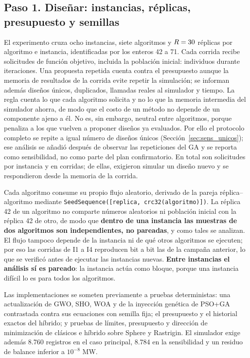 \subsection{Paso 1. Diseñar: instancias, réplicas, presupuesto y semillas}

El experimento cruza ocho instancias, siete algoritmos y $R=30$ réplicas por algoritmo e instancia, identificadas por los enteros 42 a 71. Cada corrida recibe \RequestsPerRun{} solicitudes de función objetivo, incluida la población inicial: \Population{} individuos durante \Iterations{} iteraciones. Una propuesta repetida cuenta contra el presupuesto aunque la memoria de resultados de la corrida evite repetir la simulación; se informan además diseños únicos, duplicados, llamadas reales al simulador y tiempo. La regla cuenta lo que cada algoritmo solicita y no lo que la memoria intermedia del simulador ahorra, de modo que el costo de un método no depende de un componente ajeno a él. No es, sin embargo, neutral entre algoritmos, porque penaliza a los que vuelven a proponer diseños ya evaluados. Por ello el protocolo completo se repite a igual número de diseños únicos (Sección~\ref{sec:sens_unicos}); ese análisis se añadió después de observar las repeticiones del GA y se reporta como sensibilidad, no como parte del plan confirmatorio. En total son \RequestsPerInstance{} solicitudes por instancia y \TotalDesignRequests{} en \TotalRuns{} corridas; de ellas, \SimulationsTotal{} exigieron simular un diseño nuevo y \DuplicatesTotal{} se respondieron desde la memoria de la corrida.

Cada algoritmo consume su propio flujo aleatorio, derivado de la pareja réplica--algoritmo mediante \texttt{SeedSequence([replica, crc32(algoritmo)])}. La réplica 42 de un algoritmo no comparte números aleatorios ni población inicial con la réplica 42 de otro, de modo que \textbf{dentro de una instancia las muestras de dos algoritmos son independientes, no pareadas}, y como tales se analizan. El flujo tampoco depende de la instancia ni de qué otros algoritmos se ejecuten; por eso las corridas de I1 a I4 reproducen bit a bit las de la campaña anterior, lo que se verificó antes de ejecutar las instancias nuevas. \textbf{Entre instancias el análisis sí es pareado}: la instancia actúa como bloque, porque una instancia difícil lo es para todos los algoritmos.

Las implementaciones se someten previamente a pruebas deterministas: una actualización de GWO, SHO, WOA y de la inyección genética de PSO+GA contrastada contra sus ecuaciones con semilla fija; el presupuesto y el historial exactos del híbrido; y pruebas de límites, presupuesto y dirección de minimización de clásicos e híbrido sobre Sphere y Rastrigin. El simulador exige además 8.760 registros en el caso principal, 8.784 en la sensibilidad y un residuo de balance inferior a $10^{-8}$ MW.

